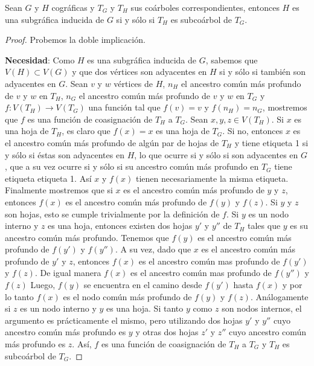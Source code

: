 \begin{lemma}\label{lema_subcoa_01}
    Sean $G$ y $H$ cográficas y $T_G$ y $T_H$ sus coárboles correspondientes, entonces $H$ es una subgráfica inducida de $G$ si y sólo si $T_H$ es subcoárbol de $T_G$.
\end{lemma}

\begin{proof}

    Probemos la doble implicación.

    \textbf{Necesidad}: Como $H$ es una subgráfica inducida de $G$, sabemos que
    $V(H)\subset V(G)$ y que dos vértices son adyacentes en $H$ si y sólo si
    también son adyacentes en $G$. Sean $v$ y $w$ vértices de $H$, $n_H$ el
    ancestro común más profundo de $v$ y $w$ en $T_H$, $n_G$ el ancestro común
    más profundo de $v$ y $w$ en $T_G$ y $f:V(T_H)\rightarrow V(T_G)$ una
    función tal que $f(v)=v$ y $f(n_H) = n_G$, mostremos que $f$ es una función
    de coasignación de $T_H$ a $T_G$. Sean $x,y,z\in V(T_H)$. Si $x$ es una
    hoja de $T_H$, es claro que $f(x) = x$ es una hoja de $T_G$. Si no,
    entonces $x$ es el ancestro común más profundo de algún par de hojas de
    $T_H$ y tiene etiqueta 1 si y sólo si éstas son adyacentes en $H$, lo que
    ocurre si y sólo si son adyacentes en $G$, que a su vez ocurre si y sólo si
    su ancestro común más profundo en $T_G$ tiene etiqueta etiqueta 1. Así $x$
    y $f(x)$ tienen necesariamente la misma etiqueta. Finalmente mostremos que
    si $x$ es el ancestro común más profundo de $y$ y $z$, entonces $f(x)$ es
    el ancestro común más profundo de $f(y)$ y $f(z)$. Si $y$ y $z$ son hojas,
    esto se cumple trivialmente por la definición de $f$. Si $y$ es un nodo
    interno y $z$ es una hoja, entonces existen dos hojas $y'$ y $y''$ de $T_H$
    tales que $y$ es su ancestro común más profundo. Tenemos que $f(y)$ es el
    ancestro común más profundo de $f(y')$ y $f(y'')$. A su vez, dado que $x$
    es el ancestro común más profundo de $y'$ y $z$, entonces $f(x)$ es el
    ancestro común mas profundo de $f(y')$ y $f(z)$. De igual manera $f(x)$ es
    el ancestro común mas profundo de $f(y'')$ y $f(z)$ Luego, $f(y)$ se
    encuentra en el camino desde $f(y')$ hasta $f(x)$ y por lo tanto $f(x)$ es
    el nodo común más profundo de $f(y)$ y $f(z)$. Análogamente si $z$ es un
    nodo interno y $y$ es una hoja. Si tanto $y$ como $z$ son nodos internos,
    el argumento es prácticamente el mismo, pero utilizando dos hojas $y'$ y
    $y''$ cuyo ancestro común más profundo es $y$ y otras dos hojas $z'$ y
    $z''$ cuyo ancestro común más profundo es $z$. Así, $f$ es una función de
    coasignación de $T_H$ a $T_G$ y $T_H$ es subcoárbol de $T_G$.


\end{proof}
